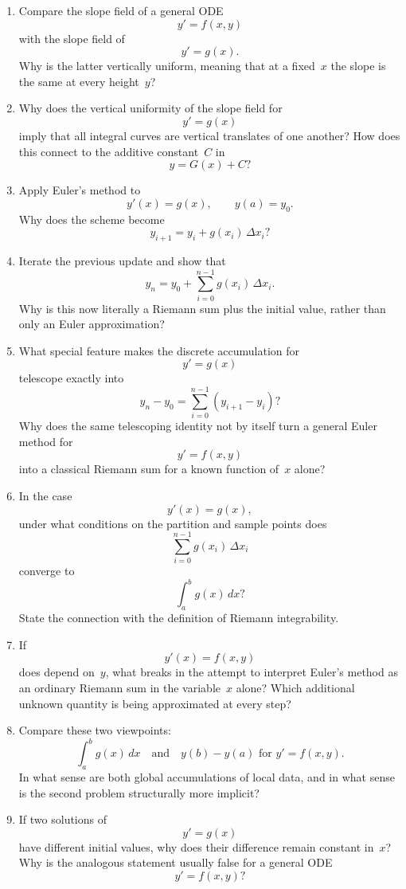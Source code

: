 \begin{enumerate}[resume]
    \[
      G'(x)=g(x).
    \]
    Why are all solutions of
    \[
      y'(x)=g(x)
    \]
    of the form
    \[
      y(x)=G(x)+C?
    \]
    How does the initial condition
    \[
      y(a)=y_0
    \]
    determine the value of~\(C\)?
  \item Compare the slope field of a general ODE
    \[
      y'=f(x,y)
    \]
    with the slope field of
    \[
      y'=g(x).
    \]
    Why is the latter vertically uniform, meaning that at a fixed~\(x\) the slope is the same at every height~\(y\)?
  \item Why does the vertical uniformity of the slope field for
    \[
      y'=g(x)
    \]
    imply that all integral curves are vertical translates of one another?
    How does this connect to the additive constant~\(C\) in
    \[
      y=G(x)+C?
    \]
  \item Apply Euler's method to
    \[
      y'(x)=g(x), \qquad y(a)=y_0.
    \]
    Why does the scheme become
    \[
      y_{i+1}=y_i+g(x_i)\,\Delta x_i?
    \]
  \item Iterate the previous update and show that
    \[
      y_n
      =
      y_0+\sum_{i=0}^{n-1} g(x_i)\,\Delta x_i.
    \]
    Why is this now literally a Riemann sum plus the initial value, rather than only an Euler approximation?
  \item What special feature makes the discrete accumulation for
    \[
      y'=g(x)
    \]
    telescope exactly into
    \[
      y_n-y_0=\sum_{i=0}^{n-1} (y_{i+1}-y_i)?
    \]
    Why does the same telescoping identity not by itself turn a general Euler method for
    \[
      y'=f(x,y)
    \]
    into a classical Riemann sum for a known function of~\(x\) alone?
  \item In the case
    \[
      y'(x)=g(x),
    \]
    under what conditions on the partition and sample points does
    \[
      \sum_{i=0}^{n-1} g(x_i)\,\Delta x_i
    \]
    converge to
    \[
      \int_a^b g(x)\,dx?
    \]
    State the connection with the definition of Riemann integrability.
  \item If
    \[
      y'(x)=f(x,y)
    \]
    does depend on~\(y\), what breaks in the attempt to interpret Euler's method as an ordinary Riemann sum in the variable~\(x\) alone?
    Which additional unknown quantity is being approximated at every step?
  \item Compare these two viewpoints:
    \[
      \int_a^b g(x)\,dx
      \quad \text{and} \quad
      y(b)-y(a) \text{ for } y'=f(x,y).
    \]
    In what sense are both global accumulations of local data, and in what sense is the second problem structurally more implicit?
  \item If two solutions of
    \[
      y'=g(x)
    \]
    have different initial values, why does their difference remain constant in~\(x\)?
    Why is the analogous statement usually false for a general ODE
    \[
      y'=f(x,y)?
    \]
\end{enumerate}

